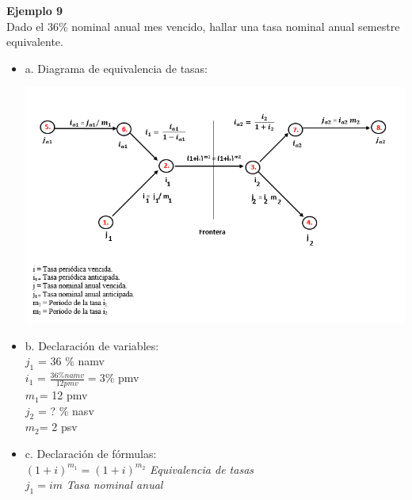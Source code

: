 \textbf{Ejemplo 9}\\

Dado el 36\% nominal anual mes vencido, hallar una tasa nominal anual semestre equivalente.\\

\begin{itemize}
	\item a. Diagrama de equivalencia de tasas:\\
	\begin{center}
		\includegraphics[height = 9.0 cm]{general}\\
	\end{center}
	
	\item b. Declaración de variables:\\
	
	${j_1}$ = 36 \% namv \\	
	${i_1}$ = $\frac{36\% namv}{12 pmv} = 3\% $ pmv\\
	
	$m_{1} $= 12 pmv \\
	${j_2}$ = ? \% nasv\\
	$m_{2} $= 2 psv\\
	
	
	\item c. Declaración de fórmulas:\\
	
	$(1+i)^{m_1} = (1+i)^{m_2}$ \hspace{35 pt} \textit{Equivalencia de tasas}\\
	$j_{1} = i m$\hspace{35 pt} \textit{Tasa nominal anual }\\
	

\end{itemize}
